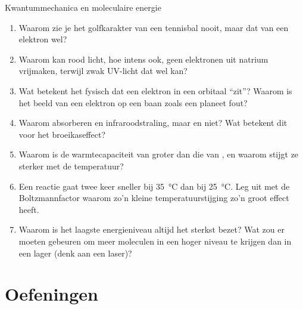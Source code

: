 \begin{reflectie}{Kwantummechanica en moleculaire energie}
\begin{enumerate}
\item Waarom zie je het golfkarakter van een tennisbal nooit, maar dat van een elektron wel?
\item Waarom kan rood licht, hoe intens ook, geen elektronen uit natrium vrijmaken, terwijl zwak UV-licht dat wel kan?
\item Wat betekent het fysisch dat een elektron in een orbitaal ``zit''? Waarom is het beeld van een elektron op een baan zoals een planeet fout?
\item Waarom absorberen  en  infraroodstraling, maar  en  niet? Wat betekent dit voor het broeikaseffect?
\item Waarom is de warmtecapaciteit van  groter dan die van , en waarom stijgt ze sterker met de temperatuur?
\item Een reactie gaat twee keer sneller bij \SI{35}{\celsius} dan bij \SI{25}{\celsius}. Leg uit met de Boltzmannfactor waarom zo'n kleine temperatuurstijging zo'n groot effect heeft.
\item Waarom is het laagste energieniveau altijd het sterkst bezet? Wat zou er moeten gebeuren om meer moleculen in een hoger niveau te krijgen dan in een lager (denk aan een laser)?
\end{enumerate}
\end{reflectie}

\newpage
\section{Oefeningen}


